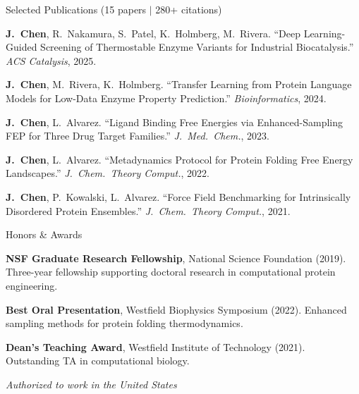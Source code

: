 \documentclass{resume}
\begin{document}
\begin{rSection2}{Selected Publications (15 papers $\vert$ 280+ citations)}

\item \textbf{J.\ Chen}, R.\ Nakamura, S.\ Patel, K.\ Holmberg, M.\ Rivera. ``Deep Learning-Guided Screening of Thermostable Enzyme Variants for Industrial Biocatalysis.'' \textit{ACS Catalysis}, 2025.

\item \textbf{J.\ Chen}, M.\ Rivera, K.\ Holmberg. ``Transfer Learning from Protein Language Models for Low-Data Enzyme Property Prediction.'' \textit{Bioinformatics}, 2024.

\item \textbf{J.\ Chen}, L.\ Alvarez. ``Ligand Binding Free Energies via Enhanced-Sampling FEP for Three Drug Target Families.'' \textit{J.\ Med.\ Chem.}, 2023.

\item \textbf{J.\ Chen}, L.\ Alvarez. ``Metadynamics Protocol for Protein Folding Free Energy Landscapes.'' \textit{J.\ Chem.\ Theory Comput.}, 2022.

\item \textbf{J.\ Chen}, P.\ Kowalski, L.\ Alvarez. ``Force Field Benchmarking for Intrinsically Disordered Protein Ensembles.'' \textit{J.\ Chem.\ Theory Comput.}, 2021.

\end{rSection2}
\vspace{-0.15cm}

\begin{rSection2}{Honors \& Awards}
\item \textbf{NSF Graduate Research Fellowship}, National Science Foundation (2019). Three-year fellowship supporting doctoral research in computational protein engineering.
\item \textbf{Best Oral Presentation}, Westfield Biophysics Symposium (2022). Enhanced sampling methods for protein folding thermodynamics.
\item \textbf{Dean's Teaching Award}, Westfield Institute of Technology (2021). Outstanding TA in computational biology.
\end{rSection2}
\vspace{-0.1cm}

\begin{center}
\vspace{0.15cm}
\textit{Authorized to work in the United States}
\end{center}
\end{document}

